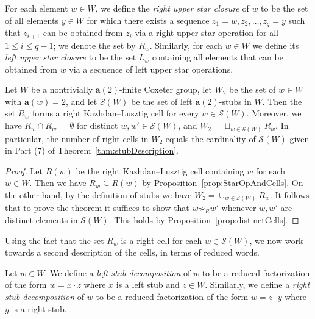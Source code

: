 \documentclass[ALCO,Unicode,published]{cedram}
\newcommand{\cals}{\mathcal{S}}
\newcommand{\la}{\mathbf{a}}
\newcommand{\kl}{Kazhdan--Lusztig }
\newcommand{\sx}{\mathcal{S}(W)}
\newcommand{\sw}{\mathcal{S}(W)}
\newcommand{\se}{\subseteq}
\begin{document}
\begin{definition}
    \label{def:closure}
    For each element $w\in W$, we define the \emph{right upper star closure} of $w$ to be the set of
    all elements $y\in W$ for which there exists a sequence $z_1=w, z_2,\dots, z_q=y$ such that
    $z_{i+1}$ can be obtained from $z_{i}$ via a right upper star operation for all $1\le i\le q-1$;
    we denote the set by $R_w$. Similarly, for each $w\in W$ we define its \emph{left upper star
    closure} to be the set $L_w$ containing all elements that can be obtained from $w$ via a
    sequence of left upper star operations.
\end{definition}

\begin{thm}
    \label{thm:cellParameterization}
    Let $W$ be a nontrivially $\la(2)$-finite Coxeter group, let $W_2$ be the set of $w\in W$ with $\la(w)=2$, and let
    $\cals(W)$ be the set of left $\la(2)$-stubs in $W$.  Then the set $R_w$ forms a right \kl cell
    for every $w\in \sx$.  Moreover, we have  $R_w\cap R_{w'}=\emptyset$ for distinct
    $w,w'\in\cals(W)$, and $W_2=\sqcup_{w\in \cals(W)}R_w$. In particular, the number of right cells
    in $W_2$ equals the cardinality of $\sw$ given in Part \textup{(}7\textup{)} of
    Theorem~\ref{thm:stubDescription}.
\end{thm}

\begin{proof}
    Let $R(w)$ be the right \kl cell containing $w$ for each $w\in W$. Then we have $R_w\se R(w)$ by
    Proposition~\ref{prop:StarOpAndCells}.  On the other hand, by the definition of stubs we have
    $W_2=\cup_{w\in \sw} R_w$.  It follows that to prove the theorem it suffices to show that
    $w\not\sim_R w'$ whenever $w,w'$ are distinct elements in $\sw$. This holds by
    Proposition~\ref{prop:distinctCells}.
\end{proof}

Using the fact that the set $R_w$ is a right cell for each $w\in\sw$, we now work towards a second
description of the cells, in terms of reduced words.  


\begin{definition}
    \label{def:stubDecomp}
    Let $w\in W$. We define a \emph{left stub decomposition} of $w$ to be a reduced factorization of
    the form $w=x\cdot z$ where $x$ is a left stub and $z\in W$.  Similarly, we define a \emph{right
    stub decomposition} of $w$ to be a reduced factorization of the form $w=z\cdot y$ where $y$ is a
    right stub.  
\end{definition}
\end{document}
